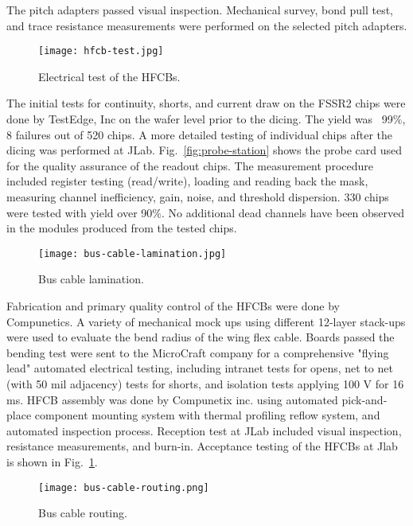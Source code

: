 The pitch adapters passed visual inspection. Mechanical survey, bond pull test, and trace resistance measurements were performed on the selected pitch adapters.

\begin{figure}[hbt] 
\centering 
\texttt{[image: hfcb-test.jpg]}
\caption{Electrical test of the HFCBs.}
\label{fig:hfcb-test}
\end{figure}

The initial tests for continuity, shorts, and current draw on the FSSR2 chips were done by TestEdge, Inc on the wafer level prior to the dicing. The yield was ~99$\%$, 8 failures out of 520 chips. A more detailed testing of individual chips after the dicing was performed at JLab.  Fig.~\ref{fig:probe-station} shows the probe card used for the quality assurance of the readout chips. The measurement procedure included register testing (read/write), loading and reading back the mask, measuring channel inefficiency, gain, noise, and threshold dispersion. 330 chips were tested with yield over 90$\%$. No additional dead channels have been observed in the modules produced from the tested chips.  

\begin{figure}[hbt] 
\centering 
\texttt{[image: bus-cable-lamination.jpg]}
\caption{Bus cable lamination.}
\label{fig:bus-cable-lamination}
\end{figure}

Fabrication and primary quality control of the HFCBs were done by Compunetics. A variety of mechanical mock ups using different 12-layer stack-ups were used to evaluate the bend radius of the wing flex cable. Boards passed the bending test were sent to the MicroCraft company for a comprehensive "flying lead" automated electrical testing, including intranet tests for opens, net to net (with 50 mil adjacency) tests for shorts, and isolation tests applying 100 V for 16 ms. HFCB assembly was done by Compunetix inc. using automated pick-and-place component mounting system with thermal profiling reflow system, and automated inspection process. Reception test at JLab included visual inspection, resistance measurements, and burn-in. Acceptance testing of the HFCBs at Jlab is shown in Fig.~\ref{fig:hfcb-test}.


\begin{figure}[hbt] 
\centering 
\texttt{[image: bus-cable-routing.png]}
\caption{Bus cable routing.}
\label{fig:bus-cable-routing}
\end{figure}

